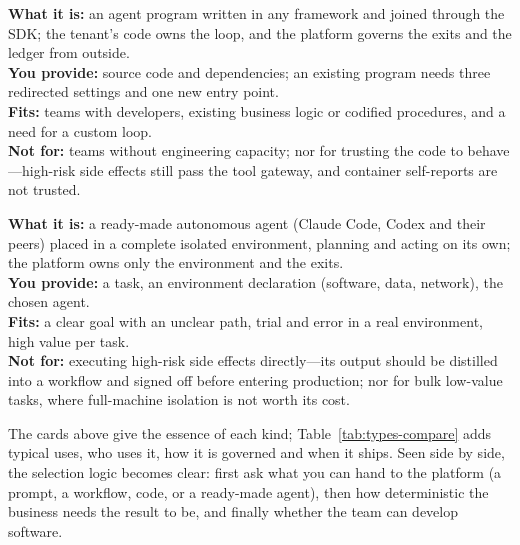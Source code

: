 \begin{tcbraster}[
  raster columns=2,
  raster equal height=rows,
  raster column skip=4mm,
  raster row skip=4mm
]
\begin{tcolorbox}
\end{tcolorbox}
\begin{tcolorbox}[
  title={T2 · Code agent: bring your own program},
  colback=GoldLight,colframe=Gold,coltitle=white,
  fonttitle=\bfseries\sffamily,fontupper=\footnotesize,
  left=2.2mm,right=2.2mm,top=1mm,bottom=1mm
]
\textbf{What it is:} an agent program written in any framework and joined through the SDK; the tenant's code owns the loop, and the platform governs the exits and the ledger from outside.\\
\textbf{You provide:} source code and dependencies; an existing program needs three redirected settings and one new entry point.\\
\textbf{Fits:} teams with developers, existing business logic or codified procedures, and a need for a custom loop.\\
\textbf{Not for:} teams without engineering capacity; nor for trusting the code to behave---high-risk side effects still pass the tool gateway, and container self-reports are not trusted.
\end{tcolorbox}
\begin{tcolorbox}[
  title={T3 · Autonomous agent: let the expert work},
  colback=RustLight,colframe=Rust,coltitle=white,
  fonttitle=\bfseries\sffamily,fontupper=\footnotesize,
  left=2.2mm,right=2.2mm,top=1mm,bottom=1mm
]
\textbf{What it is:} a ready-made autonomous agent (Claude Code, Codex and their peers) placed in a complete isolated environment, planning and acting on its own; the platform owns only the environment and the exits.\\
\textbf{You provide:} a task, an environment declaration (software, data, network), the chosen agent.\\
\textbf{Fits:} a clear goal with an unclear path, trial and error in a real environment, high value per task.\\
\textbf{Not for:} executing high-risk side effects directly---its output should be distilled into a workflow and signed off before entering production; nor for bulk low-value tasks, where full-machine isolation is not worth its cost.
\end{tcolorbox}
\end{tcbraster}

The cards above give the essence of each kind; Table~\ref{tab:types-compare} adds typical uses, who uses it, how it is governed and when it ships. Seen side by side, the selection logic becomes clear: first ask what you can hand to the platform (a prompt, a workflow, code, or a ready-made agent), then how deterministic the business needs the result to be, and finally whether the team can develop software.

